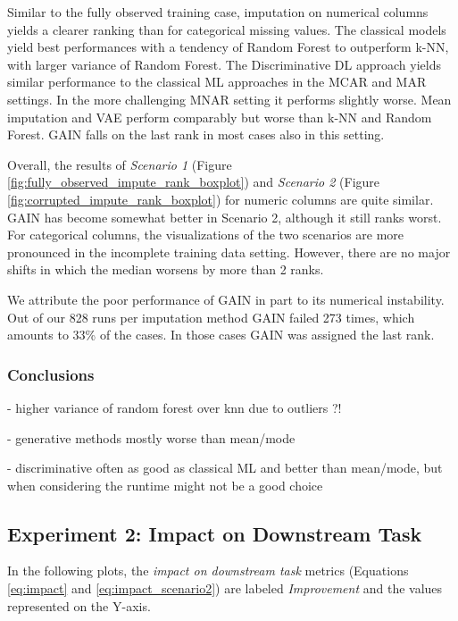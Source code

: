 Similar to the fully observed training case, imputation on numerical columns yields a clearer ranking than for categorical missing values. The classical models yield best performances with a tendency of Random Forest to outperform k-NN, with larger variance of Random Forest. The Discriminative DL approach yields similar performance to the classical ML approaches in the MCAR and MAR settings. In the more challenging MNAR setting it performs slightly worse. Mean imputation and VAE perform comparably but worse than k-NN and Random Forest. GAIN falls on the last rank in most cases also in this setting.

Overall, the results of \textit{Scenario 1} (Figure \ref{fig:fully_observed_impute_rank_boxplot}) and \textit{Scenario 2} (Figure \ref{fig:corrupted_impute_rank_boxplot}) for numeric columns are quite similar. GAIN has become somewhat better in Scenario 2, although it still ranks worst. For categorical columns, the visualizations of the two scenarios are more pronounced in the incomplete training data setting. However, there are no major shifts in which the median worsens by more than 2 ranks.

We attribute the poor performance of GAIN in part to its numerical instability. Out of our 828 runs per imputation method GAIN failed 273 times, which amounts to 33\% of the cases. In those cases GAIN was assigned the last rank.

\subsubsection{Conclusions}

- higher variance of random forest over knn due to outliers ?!

- generative methods mostly worse than mean/mode

- discriminative often as good as classical ML and better than mean/mode, but when considering the runtime might not be a good choice



\subsection{Experiment 2: Impact on Downstream Task}

In the following plots, the \textit{impact on downstream task} metrics (Equations \ref{eq:impact} and \ref{eq:impact_scenario2}) are labeled \textit{Improvement} and the values represented on the Y-axis.


